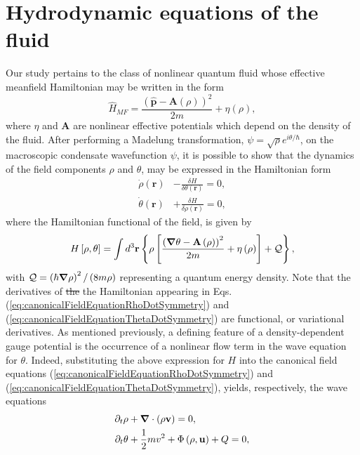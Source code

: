 \documentclass[twocolumn, nofootinbib, nobibnotes, amsmath,amssymb,aps, pra, floatfix]{revtex4-1}
\renewcommand{\v}[1]{\ensuremath{\mathbf{#1}}} %
\newcommand{\gv}[1]{\ensuremath{\mbox{\boldmath$ #1 $}}} %
\newcommand{\grad}[1]{\gv{\nabla} #1} %
\renewcommand{\div}[1]{\gv{\nabla} \cdot #1} %
\begin{document}
\section{\label{sec:hydro}Hydrodynamic equations of the fluid}
Our study pertains to the class of nonlinear quantum fluid whose effective meanfield Hamiltonian may be written in the form
\begin{equation}
	\hat{H}_{MF} = \frac{\left( \hat{\v{p}}-\v{A}\left( \rho \right) \right)^2}{2m}+\eta\left( \rho \right),
	\label{eq:meanfieldHamiltonianNonlinearGaugeCoupledQuantumFluid}
\end{equation}
where $\eta$ and $\v{A}$ are nonlinear effective potentials which depend on the density of the fluid.
After performing a Madelung transformation, $\psi=\sqrt{\rho}e^{i\theta/\hbar}$, on the macroscopic condensate wavefunction $\psi$, it is possible to show \cite{buggy2020hydrodynamics} that the dynamics of the field components $\rho$ and $\theta$, may be expressed in the Hamiltonian form 
\begin{align}
  \dot{\rho}\left( \v{r} \right)&-\frac{\delta H}{\delta\theta\left( \v{r} \right)}=0, \label{eq:canonicalFieldEquationRhoDotSymmetry} \\
  \dot{\theta}\left( \v{r} \right)&+\frac{\delta H}{\delta\rho\left( \v{r} \right)}=0, \label{eq:canonicalFieldEquationThetaDotSymmetry}
\end{align}
where the Hamiltonian functional of the field, is given by 
\begin{equation}
	H\left[ \rho,\theta \right]=\int d^3\v{r}\left\{  \rho\left[\frac{\left( \grad{\theta}-\v{A}\left( \rho \right) \right)^2}{2m}+\eta\left( \rho \right)\right]+\mathcal{Q}\right\},
	\label{eq:HamiltonianDensityNonlinearGaugeCoupledQuantumFluid}
\end{equation}
with $\mathcal{Q}=\left(\hbar\grad{\rho}\right)^2/\left( 8m\rho \right)$ representing a quantum energy density.
Note that the derivatives of \sout{the} the Hamiltonian appearing in Eqs. (\ref{eq:canonicalFieldEquationRhoDotSymmetry}) and (\ref{eq:canonicalFieldEquationThetaDotSymmetry}) are functional, or variational derivatives.
As mentioned previously, a defining feature of a density-dependent gauge potential is the occurrence of a nonlinear flow term in the wave equation for $\theta$.
Indeed, substituting the above expression for $H$ into the canonical field equations (\ref{eq:canonicalFieldEquationRhoDotSymmetry}) and (\ref{eq:canonicalFieldEquationThetaDotSymmetry}), yields, respectively, the wave equations
\begin{align}
	\partial_t\rho&+\div{\left(\rho\v{v}\right)}=0, \label{eq:waveEquationRhoNLGCQF} \\
	\partial_t\theta&+\frac{1}{2}mv^2+\Phi\left( \rho,\v{u} \right)+Q=0, \label{eq:waveEquationThetaNLGCQF}
\end{align}
\end{document}
